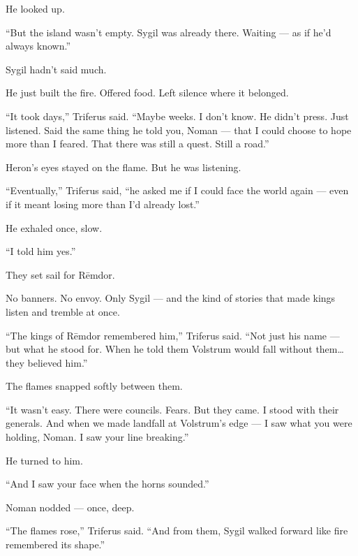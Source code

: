 \documentclass[9pt]{article}
\begin{document}
He looked up.

“But the island wasn’t empty. Sygil was already there. Waiting — as if he’d always known.”

\vspace{1em}

Sygil hadn’t said much.

He just built the fire. Offered food. Left silence where it belonged.

“It took days,” Triferus said. “Maybe weeks. I don’t know. He didn’t press. Just listened. Said the same thing he told you, Noman — that I could choose to hope more than I feared. That there was still a quest. Still a road.”

\vspace{1em}

Heron’s eyes stayed on the flame. But he was listening.

“Eventually,” Triferus said, “he asked me if I could face the world again — even if it meant losing more than I’d already lost.”

He exhaled once, slow.

“I told him yes.”

\vspace{1em}

They set sail for Rēmdor.

No banners. No envoy. Only Sygil — and the kind of stories that made kings listen and tremble at once.

“The kings of Rēmdor remembered him,” Triferus said. “Not just his name — but what he stood for. When he told them Volstrum would fall without them… they believed him.”

The flames snapped softly between them.

“It wasn’t easy. There were councils. Fears. But they came. I stood with their generals. And when we made landfall at Volstrum’s edge — I saw what you were holding, Noman. I saw your line breaking.”

\vspace{1em}

He turned to him.

“And I saw your face when the horns sounded.”

Noman nodded — once, deep.

\vspace{1em}

“The flames rose,” Triferus said. “And from them, Sygil walked forward like fire remembered its shape.”

\vspace{1em}
\end{document}
